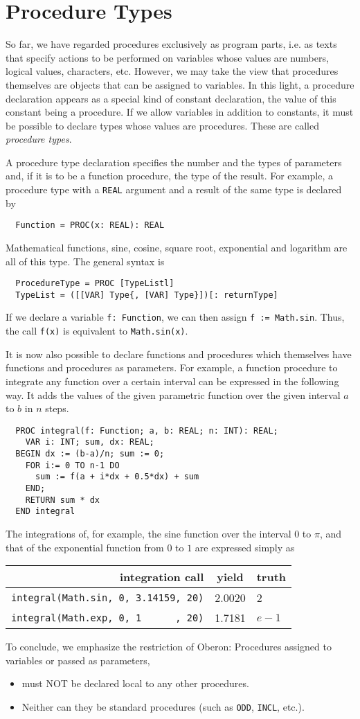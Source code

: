 \chapter{Procedure Types}
So far, we have regarded procedures exclusively as program parts, i.e. as texts that specify actions
to be performed on variables whose values are numbers, logical values, characters, etc. However,
we may take the view that procedures themselves are objects that can be assigned to variables. In
this light, a procedure declaration appears as a special kind of constant declaration, the value of
this constant being a procedure. If we allow variables in addition to constants, it must be possible to
declare types whose values are procedures. These are called \emph{procedure types}.

A procedure type declaration specifies the number and the types of parameters and, if it is to be a
function procedure, the type of the result. For example, a procedure type with a \verb|REAL| argument
and a result of the same type is declared by
\begin{verbatim}
  Function = PROC(x: REAL): REAL
\end{verbatim}
Mathematical functions, sine, cosine, square root, exponential and logarithm are all of this type.
The general syntax is
\begin{verbatim}
  ProcedureType = PROC [TypeListl]
  TypeList = ([[VAR] Type{, [VAR] Type}])[: returnType]
\end{verbatim}
If we declare a variable \verb|f: Function|, we can then assign \verb|f := Math.sin|.
Thus, the call \verb|f(x)| is equivalent to \verb|Math.sin(x)|.

It is now also possible to declare functions and procedures which themselves have functions
and procedures as parameters. For example, a function procedure to integrate any function
over a certain interval can be expressed in the following way. It adds the values of the
given parametric function over the given interval $a$ to $b$ in $n$ steps.
\begin{verbatim}
  PROC integral(f: Function; a, b: REAL; n: INT): REAL;
    VAR i: INT; sum, dx: REAL;
  BEGIN dx := (b-a)/n; sum := 0;
    FOR i:= 0 TO n-1 DO
      sum := f(a + i*dx + 0.5*dx) + sum
    END;
    RETURN sum * dx
  END integral
\end{verbatim}
The integrations of, for example, the sine function over the interval $0$ to $\pi$, and
that of the exponential function from $0$ to $1$ are expressed simply as
\begin{table}[h!]
  \begin{tabular}{r|c|l}
    integration call                          & yield  & truth \\\hline
    \verb|integral(Math.sin, 0, 3.14159, 20)| & 2.0020 & 2 \\
    \verb|integral(Math.exp, 0, 1      , 20)| & 1.7181 & $e-1$
  \end{tabular}
\end{table}

To conclude, we emphasize the restriction of Oberon:
Procedures assigned to variables or passed as parameters,
\begin{itemize}
  \item must NOT be declared local to any other procedures.
  \item Neither can they be standard procedures (such as \verb|ODD|, \verb|INCL|, etc.).
\end{itemize}
